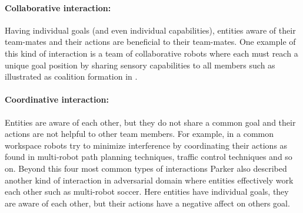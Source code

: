 \paragraph{Collaborative interaction:}
Having individual goals (and even individual capabilities), entities aware of their team-mates and their actions are beneficial to their team-mates. One example of this kind of interaction is a team of collaborative robots where each must reach a unique goal position by sharing sensory capabilities to all members such as illustrated as coalition formation in \cite{Parker+2006}.
\paragraph{Coordinative interaction:}
Entities are aware of each other, but they do not share a common goal and their actions are not helpful to other team members. For example, in a common workspace robots try to minimize interference by coordinating their actions as found in multi-robot path planning techniques, traffic control techniques and so on.
Beyond this four most common types of interactions Parker also described another kind of interaction in adversarial domain where entities effectively work each other such as multi-robot soccer. Here entities have individual goals, they are aware of each other, but their actions have a negative affect on others goal.
